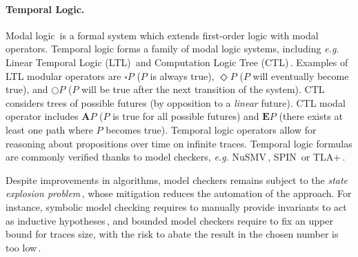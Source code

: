 
\paragraph{Temporal Logic.}
%
Modal logic\,\cite{chagrov1997modal} is a formal system which extends
first-order logic with modal operators.
%
Temporal logic forms a family of modal logic systems, including \emph{e.g.}
Linear Temporal Logic (LTL)\,\cite{sistla1985ltl} and Computation Logic Tree
(CTL)\,\cite{clarke1981ctl}.
%
Examples of LTL modular operators are \( \square P \) (\( P \) is always true),
\( \Diamond P \) (\( P \) will eventually become true), and \( \bigcirc P \)
(\( P \) will be true after the next transition of the system).
%
CTL considers trees of possible futures (by opposition to a \emph{linear}
future).
%
CTL modal operator includes \( \mathbf{A} P \) (\( P \) is true for all possible
futures) and \( \mathbf{E} P \) (there exists at least one path where \( P \)
becomes true).
%
Temporal logic operators allow for reasoning about propositions over time on
infinite traces.
%
Temporal logic formulas are commonly verified thanks to model checkers,
\emph{e.g.}  NuSMV\,\cite{cimatti2002nusmv}, SPIN\,\cite{holzmann1997spin} or
TLA+\,\cite{lamport2002tla}.

Despite improvements in algorithms, model checkers remains subject to the
\emph{state explosion problem}\,\cite{clarke2012model}, whose mitigation reduces
the automation of the approach.
%
%
For instance, symbolic model checking requires to manually provide invariants to
act as inductive hypotheses\,\cite{mcmillan2000symbolic}, and bounded model
checkers require to fix an upper bound for traces size, with the risk to abate
the result in the chosen number is too low\,\cite{biere2003bounded}.

